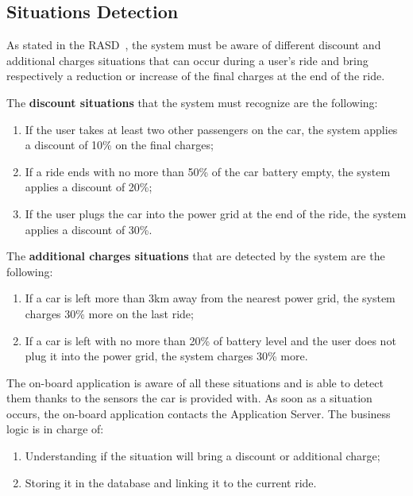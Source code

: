 \subsection{Situations Detection}
As stated in the RASD~\cite{rasd}, the system must be aware of different discount and additional charges situations that can occur during a user's ride and bring respectively a reduction or increase of the final charges at the end of the ride.

The \textbf{discount situations} that the system must recognize are the following:
\begin{enumerate}
\item If the user takes at least two other passengers on the car, the system applies a discount of 10\% on the final charges;
\item If a ride ends with no more than 50\% of the car battery empty, the system applies a discount of 20\%;
\item If the user plugs the car into the power grid at the end of the ride, the system applies a discount of 30\%.
\end{enumerate}

\noindent
The \textbf{additional charges situations} that are detected by the system are the following:
\begin{enumerate}
\item If a car is left more than 3km away from the nearest power grid, the system charges 30\% more on the last ride;
\item If a car is left with no more than 20\% of battery level and the user does not plug it into the power grid, the system charges 30\% more.
\end{enumerate}

\noindent
The on-board application is aware of all these situations and is able to detect them thanks to the sensors the car is provided with.
As soon as a situation occurs, the on-board application contacts the Application Server. The business logic is in charge of:
\begin{enumerate}
\item Understanding if the situation will bring a discount or additional charge;
\item Storing it in the database and linking it to the current ride.
\end{enumerate}

